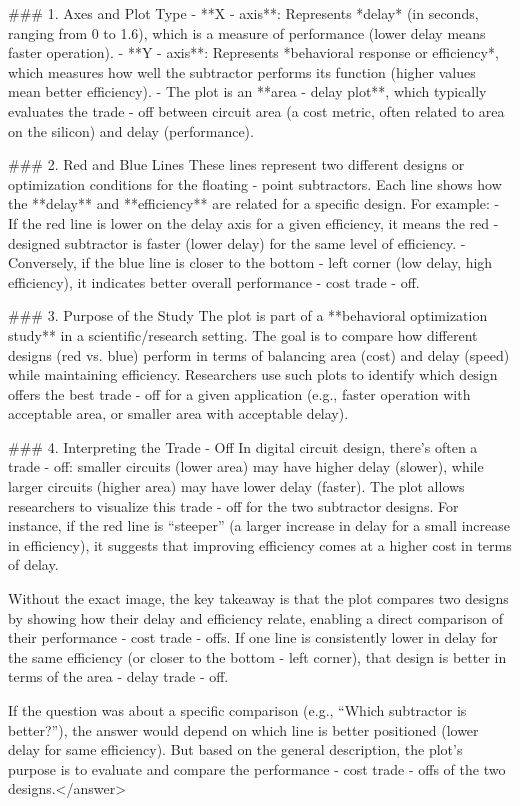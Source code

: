 ### 1. Axes and Plot Type  
- **X - axis**: Represents *delay* (in seconds, ranging from 0 to 1.6), which is a measure of performance (lower delay means faster operation).  
- **Y - axis**: Represents *behavioral response or efficiency*, which measures how well the subtractor performs its function (higher values mean better efficiency).  
- The plot is an **area - delay plot**, which typically evaluates the trade - off between circuit area (a cost metric, often related to area on the silicon) and delay (performance).  


### 2. Red and Blue Lines  
These lines represent two different designs or optimization conditions for the floating - point subtractors. Each line shows how the **delay** and **efficiency** are related for a specific design. For example:  
- If the red line is lower on the delay axis for a given efficiency, it means the red - designed subtractor is faster (lower delay) for the same level of efficiency.  
- Conversely, if the blue line is closer to the bottom - left corner (low delay, high efficiency), it indicates better overall performance - cost trade - off.  


### 3. Purpose of the Study  
The plot is part of a **behavioral optimization study** in a scientific/research setting. The goal is to compare how different designs (red vs. blue) perform in terms of balancing area (cost) and delay (speed) while maintaining efficiency. Researchers use such plots to identify which design offers the best trade - off for a given application (e.g., faster operation with acceptable area, or smaller area with acceptable delay).  


### 4. Interpreting the Trade - Off  
In digital circuit design, there’s often a trade - off: smaller circuits (lower area) may have higher delay (slower), while larger circuits (higher area) may have lower delay (faster). The plot allows researchers to visualize this trade - off for the two subtractor designs. For instance, if the red line is “steeper” (a larger increase in delay for a small increase in efficiency), it suggests that improving efficiency comes at a higher cost in terms of delay.  


Without the exact image, the key takeaway is that the plot compares two designs by showing how their delay and efficiency relate, enabling a direct comparison of their performance - cost trade - offs. If one line is consistently lower in delay for the same efficiency (or closer to the bottom - left corner), that design is better in terms of the area - delay trade - off.  


If the question was about a specific comparison (e.g., “Which subtractor is better?”), the answer would depend on which line is better positioned (lower delay for same efficiency). But based on the general description, the plot’s purpose is to evaluate and compare the performance - cost trade - offs of the two designs.</answer>
